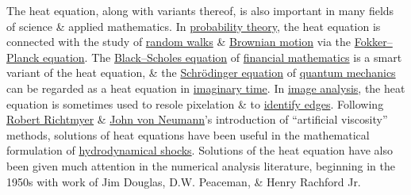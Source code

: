 \documentclass{article}
\begin{document}
The heat equation, along with variants thereof, is also important in many fields of science \& applied mathematics. In \href{https://en.wikipedia.org/wiki/Probability_theory}{probability theory}, the heat equation is connected with the study of \href{https://en.wikipedia.org/wiki/Random_walk}{random walks} \& \href{https://en.wikipedia.org/wiki/Brownian_motion}{Brownian motion} via the \href{https://en.wikipedia.org/wiki/Fokker%E2%80%93Planck_equation}{Fokker--Planck equation}. The \href{https://en.wikipedia.org/wiki/Black%E2%80%93Scholes_equation}{Black--Scholes equation} of \href{https://en.wikipedia.org/wiki/Financial_mathematics}{financial mathematics} is a smart variant of the heat equation, \& the \href{https://en.wikipedia.org/wiki/Schr%C3%B6dinger_equation}{Schr\"odinger equation} of \href{https://en.wikipedia.org/wiki/Quantum_mechanics}{quantum mechanics} can be regarded as a heat equation in \href{https://en.wikipedia.org/wiki/Imaginary_time}{imaginary time}. In \href{https://en.wikipedia.org/wiki/Image_analysis}{image analysis}, the heat equation is sometimes used to resole pixelation \& to \href{https://en.wikipedia.org/wiki/Edge_detection}{identify edges}. Following \href{https://en.wikipedia.org/wiki/Robert_D._Richtmyer}{\sc Robert Richtmyer} \& \href{https://en.wikipedia.org/wiki/John_von_Neumann}{\sc John von Neumann}'s introduction of ``artificial viscosity'' methods, solutions of heat equations have been useful in the mathematical formulation of \href{https://en.wikipedia.org/wiki/Shock_(fluid_dynamics)}{hydrodynamical shocks}. Solutions of the heat equation have also been given much attention in the numerical analysis literature, beginning in the 1950s with work of {\sc Jim Douglas, D.W. Peaceman, \& Henry Rachford Jr.}
\end{document}
